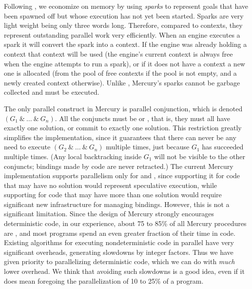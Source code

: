 Following \citet{simonmar_2009_multicore_rts},
we economize on memory by using \emph{sparks}
to represent goals that have been spawned off
but whose execution has not yet been started.
Sparks are very light weight being only three words long.
Therefore, compared to contexts,
they represent outstanding parallel work very efficiently.
When an engine executes a spark it will convert the spark into a context.
If the engine was already holding a context that context will be used
(the engine's current context is always free when the engine attempts to run
a spark),
or if it does not have a context a new one is allocated
(from the pool of free contexts if the pool is not empty,
and a newly created context otherwise).
Unlike \citet{simonmar_2009_multicore_rts},
Mercury's sparks cannot be garbage collected and must be executed.

The only parallel construct in Mercury is parallel conjunction,
which is denoted $(G_1~\&~\ldots~\&~G_n)$.
All the conjuncts must be \ddet or \dccmulti,
that is, they must all have exactly one solution,
or commit to exactly one solution.
This restriction greatly simplifies the implementation,
since it guarantees that there can never be any need
to execute $(G_2~\&~\ldots~\&~G_n)$ multiple times,
just because $G_1$ has succeeded multiple times.
(Any local backtracking inside $G_1$ will not be visible to the other conjuncts;
bindings made by \ddet code are never retracted.)
The current Mercury implementation supports parallelism only for \ddet and \dccmulti,
since supporting it for code that may have no solution
would represent speculative execution,
while supporting for code that may have more than one solution
would require significant new infrastructure for managing bindings.
However, this is not a significant limitation.
Since the design of Mercury strongly encourages deterministic code,
in our experience, about 75 to 85\% of all Mercury procedures are \ddet,
and most programs spend an even greater fraction of their time in \ddet code.
Existing algorithms for executing nondeterministic code in parallel
have very significant overheads, generating slowdowns by integer factors.
Thus we have given priority to parallelizing deterministic code,
which we can do with \emph{much} lower overhead.
We think that avoiding such slowdowns is a good idea,
even if it does mean foregoing the parallelization of 10 to 25\% of a program.


